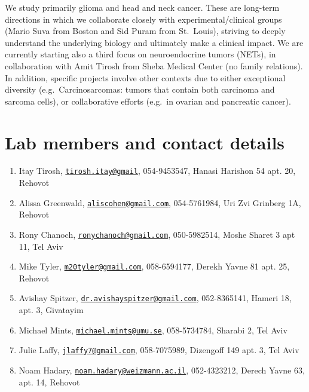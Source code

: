 \documentclass[]{book}
\providecommand{\tightlist}{%
  \setlength{\itemsep}{0pt}\setlength{\parskip}{0pt}}
\begin{document}
We study primarily glioma and head and neck cancer. These are long-term
directions in which we collaborate closely with experimental/clinical
groups (Mario Suva from Boston and Sid Puram from St.~Louis), striving
to deeply understand the underlying biology and ultimately make a
clinical impact. We are currently starting also a third focus on
neuroendocrine tumors (NETs), in collaboration with Amit Tirosh from
Sheba Medical Center (no family relations). In addition, specific
projects involve other contexts due to either exceptional diversity
(e.g.~Carcinosarcomas: tumors that contain both carcinoma and sarcoma
cells), or collaborative efforts (e.g.~in ovarian and pancreatic
cancer).

\chapter{Lab members and contact details}\label{contact}

\begin{enumerate}
\def\labelenumi{\arabic{enumi}.}
\tightlist
\item
  Itay Tirosh,
  \href{mailto:tirosh.itay@gmail}{\nolinkurl{tirosh.itay@gmail}},
  054-9453547, Hanasi Harishon 54 apt. 20, Rehovot
\item
  Alissa Greenwald,
  \href{mailto:aliscohen@gmail.com}{\nolinkurl{aliscohen@gmail.com}},
  054-5761984, Uri Zvi Grinberg 1A, Rehovot
\item
  Rony Chanoch,
  \href{mailto:ronychanoch@gmail.com}{\nolinkurl{ronychanoch@gmail.com}},
  050-5982514, Moshe Sharet 3 apt 11, Tel Aviv
\item
  Mike Tyler,
  \href{mailto:m20tyler@gmail.com}{\nolinkurl{m20tyler@gmail.com}},
  058-6594177, Derekh Yavne 81 apt. 25, Rehovot
\item
  Avishay Spitzer,
  \href{mailto:dr.avishayspitzer@gmail.com}{\nolinkurl{dr.avishayspitzer@gmail.com}},
  052-8365141, Hameri 18, apt. 3, Givatayim
\item
  Michael Mints,
  \href{mailto:michael.mints@umu.se}{\nolinkurl{michael.mints@umu.se}},
  058-5734784, Sharabi 2, Tel Aviv
\item
  Julie Laffy,
  \href{mailto:jlaffy7@gmail.com}{\nolinkurl{jlaffy7@gmail.com}},
  058-7075989, Dizengoff 149 apt. 3, Tel Aviv
\item
  Noam Hadary,
  \href{mailto:noam.hadary@weizmann.ac.il}{\nolinkurl{noam.hadary@weizmann.ac.il}},
  052-4323212, Derech Yavne 63, apt. 14, Rehovot
\end{enumerate}
\end{document}

